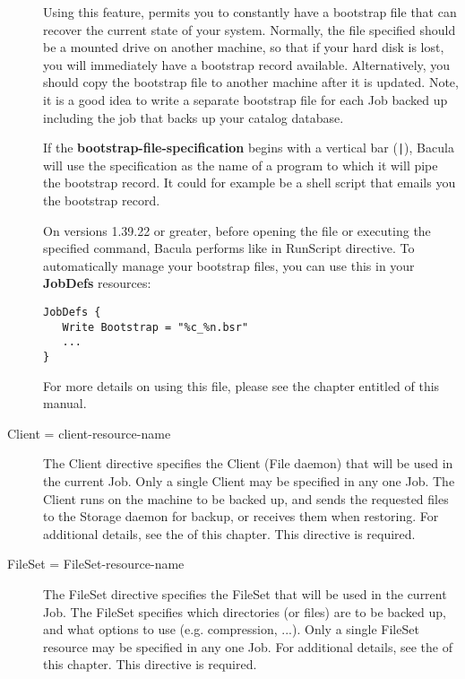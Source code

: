 \begin{description}
   Using this feature, permits you to constantly have a bootstrap file that
   can recover the current state of your system.  Normally, the file
   specified should be a mounted drive on another machine, so that if your
   hard disk is lost, you will immediately have a bootstrap record
   available.  Alternatively, you should copy the bootstrap file to another
   machine after it is updated. Note, it is a good idea to write a separate
   bootstrap file for each Job backed up including the job that backs up
   your catalog database.

   If the {\bf bootstrap-file-specification} begins with a vertical bar
   (\verb+|+), Bacula will use the specification as the name of a program to which
   it will pipe the bootstrap record.  It could for example be a shell
   script that emails you the bootstrap record.

   On versions 1.39.22 or greater, before opening the file or executing the
   specified command, Bacula performs 
    like in RunScript
   directive. To automatically manage your bootstrap files, you can use
   this in your {\bf JobDefs} resources:
\begin{verbatim}
JobDefs {
   Write Bootstrap = "%c_%n.bsr"
   ...
}
\end{verbatim}

   For more details on using this file, please see the chapter entitled
    of this manual.

\item [Client = \lt{}client-resource-name\gt{}]
   The Client directive  specifies the Client (File daemon) that will be used in
   the  current Job. Only a single Client may be specified in any one Job.  The
   Client runs on the machine to be backed up,  and sends the requested files to
   the Storage daemon for backup,  or receives them when restoring. For
   additional details, see the  
    of this chapter.
   This directive is required. 

\item [FileSet = \lt{}FileSet-resource-name\gt{}]
   The FileSet directive specifies the FileSet that will be used in the
   current Job.  The FileSet specifies which directories (or files) are to
   be backed up, and what options to use (e.g.  compression, ...).  Only a
   single FileSet resource may be specified in any one Job.  For additional
   details, see the  of
   this chapter.  This directive is required.


\end{description}
